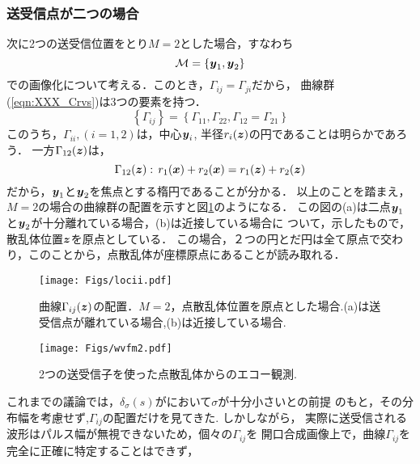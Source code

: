 \subsubsection{送受信点が二つの場合}
次に2つの送受信位置をとり$M=2$とした場合，すなわち
\begin{equation}
	{\cal M} =\left\{ 
		\mbox{\boldmath $y$}_1, \mbox{\boldmath $y$}_2
	\right\}
	\label{eqn:XXX_M2}
\end{equation}
での画像化について考える．このとき，$\Gamma_{ij}=\Gamma_{ji}$だから，
曲線群(\ref{eqn:XXX_Crvs})は3つの要素を持つ．
\begin{equation}
	\left\{ \Gamma_{ij} \right\} = \left\{ \Gamma_{11},\Gamma_{22}, \Gamma_{12}=\Gamma_{21}\right\}
	\label{eqn:}
\end{equation}
このうち，$\Gamma_{ii}, (i=1,2)$は，中心$\mbox{\boldmath $y$}_i$, 半径$r_i(\mbox{\boldmath $z$})$の円であることは明らかであろう．
一方$\Gamma_{12}(\mbox{\boldmath $z$})$は，
\begin{equation}
	\Gamma_{12}(\mbox{\boldmath $z$}): \, r_1(\mbox{\boldmath $x$})+r_2(\mbox{\boldmath $x$})=r_1(\mbox{\boldmath $z$}) +r_2(\mbox{\boldmath $z$})
	\label{eqn:}
\end{equation}
だから，$\mbox{\boldmath $y$}_1$と$\mbox{\boldmath $y$}_2$を焦点とする楕円であることが分かる．
以上のことを踏まえ，$M=2$の場合の曲線群の配置を示すと図\ref{fig:XXX_locii}のようになる．
この図の(a)は二点$\mbox{\boldmath $y$}_1$と$\mbox{\boldmath $y$}_2$が十分離れている場合，(b)は近接している場合に
ついて，示したもので，散乱体位置$\mbox{\boldmath $z$}$を原点としている．
この場合，２つの円とだ円は全て原点で交わり，このことから，点散乱体が座標原点にあることが読み取れる．
\begin{figure}[h]
	\begin{center}
	\texttt{[image: Figs/locii.pdf]} 
	\end{center}
	\caption{曲線$\Gamma_{ij}(\mbox{\boldmath $z$})$の配置．$M=2$，点散乱体位置を原点とした場合.(a)は送受信点が離れている場合,(b)は近接している場合.} 
	\label{fig:XXX_locii}
\end{figure}
\begin{figure}[h]
	\begin{center}
	\texttt{[image: Figs/wvfm2.pdf]} 
	\end{center}
	\caption{2つの送受信子を使った点散乱体からのエコー観測.} 
	\label{fig:XXX_wvfm2}
\end{figure}
これまでの議論では，$\delta_\sigma(s)$がにおいて$\sigma$が十分小さいとの前提
のもと，その分布幅を考慮せず,$\Gamma_{ij}$の配置だけを見てきた. しかしながら，
実際に送受信される波形はパルス幅が無視できないため，個々の$\Gamma_{ij}$を
開口合成画像上で，曲線$\Gamma_{ij}$を完全に正確に特定することはできず，
